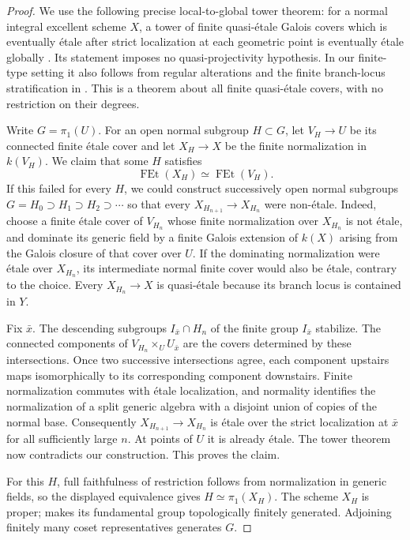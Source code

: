 \begin{proof}
We use the following precise local-to-global tower theorem:
for a normal integral excellent scheme $X$, a tower of finite
quasi-\'etale Galois covers which is eventually \'etale after
strict localization at each geometric point is eventually
\'etale globally
\cite[Theorem 3.7, pp.~708--709]{CarvajalRojasStabler2023D}.
Its statement imposes no quasi-projectivity hypothesis.  In our
finite-type setting it also follows from regular alterations and
the finite branch-locus stratification in
\cite[Theorem 2 and \S4, proof of (i)$\Rightarrow$(iii),
pp.~6--7]{Stibitz2017D}.  This is a theorem about all finite
quasi-\'etale covers, with no restriction on their degrees.

Write $G=\pi_1(U)$.  For an open normal subgroup $H\subset G$,
let $V_H\to U$ be its connected finite \'etale cover and let
$X_H\to X$ be the finite normalization in $k(V_H)$.  We claim
that some $H$ satisfies
\[
              \operatorname{FEt}(X_H)
                    \simeq\operatorname{FEt}(V_H).
\]
If this failed for every $H$, we could construct successively
open normal subgroups $G=H_0\supset H_1\supset H_2\supset\cdots$
so that every $X_{H_{n+1}}\to X_{H_n}$ were non-\'etale.  Indeed,
choose a finite \'etale cover of $V_{H_n}$ whose finite
normalization over $X_{H_n}$ is not \'etale, and dominate its
generic field by a finite Galois extension of $k(X)$ arising
from the Galois closure of that cover over $U$.  If the
dominating normalization were \'etale over $X_{H_n}$, its
intermediate normal finite cover would also be \'etale, contrary
to the choice.  Every $X_{H_n}\to X$ is quasi-\'etale because
its branch locus is contained in $Y$.

Fix $\bar x$.  The descending subgroups
$I_{\bar x}\cap H_n$ of the finite group $I_{\bar x}$ stabilize.
The connected components of $V_{H_n}\times_U U_{\bar x}$ are
the covers determined by these intersections.  Once two
successive intersections agree, each component upstairs maps
isomorphically to its corresponding component downstairs.
Finite normalization commutes with \'etale localization, and
normality identifies the normalization of a split generic
algebra with a disjoint union of copies of the normal base.
Consequently $X_{H_{n+1}}\to X_{H_n}$ is \'etale over the
strict localization at $\bar x$ for all sufficiently large
$n$.  At points of $U$ it is already \'etale.  The tower theorem
now contradicts our construction.  This proves the claim.

For this $H$, full faithfulness of restriction follows from
normalization in generic fields, so the displayed equivalence
gives $H\simeq\pi_1(X_H)$.  The scheme $X_H$ is proper;
\cite[X, Theorem 2.9]{SGA1} makes its fundamental group
topologically finitely generated.  Adjoining finitely many
coset representatives generates $G$.


\end{proof}
